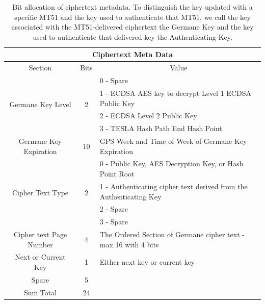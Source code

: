 \documentclass[letterpaper,times]{IONconf/IONconf}
\begin{document}
\begin{table}[H]
\center
\begin{tabular}{|c|c|l|} \hline
	\multicolumn{3}{|c|}{Ciphertext Meta Data} \\ \hline
	Section & Bits & \multicolumn{1}{|c|}{Value} \\ \hline
	\multirow{4}{*}{Germane Key Level} & \multirow{4}{*}{2} & 0 - Spare \\ 
	& & 1 - ECDSA AES key to decrypt Level 1 ECDSA Public Key \\
	& & 2 - ECDSA Level 2 Public Key \\
	& & 3 - TESLA Hash Path End Hash Point \\ \hline
	Germane Key Expiration & 10 & GPS Week and Time of Week of Germane Key Expiration \\ \hline
	\multirow{4}{*}{Cipher Text Type} & \multirow{4}{*}{2} & 0 - Public Key, AES Decryption Key, or Hash Point Root \\
	& & 1 - Authenticating cipher text derived from the Authenticating Key \\ 
	& & 2 - Spare \\ 
	& & 3 - Spare \\ \hline
	Cipher text Page Number & 4 & The Ordered Section of Germane cipher text - max 16 with 4 bits\\ \hline
	Next or Current Key & 1 & Either next key or current key \\ \hline
	Spare & 5 & \\ \hline
	Sum Total & 24 & \\ \hline
\end{tabular}
\caption{Bit allocation of ciphertext metadata. To distinguish the key updated with a specific MT51 and the key used to authenticate that MT51, we call the key associated with the MT51-delivered ciphertext the Germane Key and the key used to authenticate that delivered key the Authenticating Key.}
\label{tab: meta-data table1}
\end{table}



\end{document}
